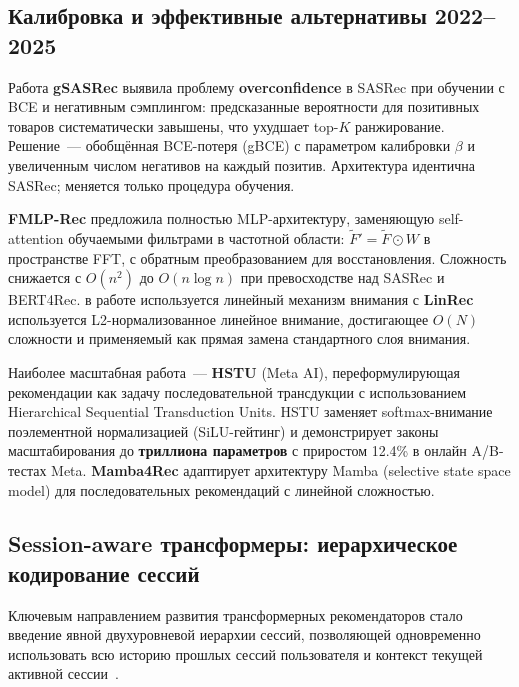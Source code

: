 \subsection{Калибровка и эффективные альтернативы 2022–2025}
\label{subsec:ch1:efficient}

Работа \textbf{gSASRec} \cite{petrov2023gsasrec} выявила проблему \textbf{overconfidence} в SASRec при обучении с BCE и негативным сэмплингом: предсказанные вероятности для позитивных товаров систематически завышены, что ухудшает top-$K$ ранжирование. 
Решение~--- обобщённая BCE-потеря (gBCE) с параметром калибровки $\beta$ и увеличенным числом негативов на каждый позитив. 
Архитектура идентична SASRec; меняется только процедура обучения.

\textbf{FMLP-Rec} \cite{zhou2022fmlprec} предложила полностью MLP-архитектуру, заменяющую self-attention обучаемыми фильтрами в частотной области: $\tilde{F}' = \tilde{F} \odot W$ в пространстве FFT, с обратным преобразованием для восстановления. 
Сложность снижается с $O(n^2)$ до $O(n \log n)$ при превосходстве над SASRec и BERT4Rec. 
в работе используется линейный механизм внимания с \textbf{LinRec} \cite{liu2023linrec} используется L2-нормализованное линейное внимание, достигающее $O(N)$ сложности и применяемый как прямая замена стандартного слоя внимания.

Наиболее масштабная работа~--- \textbf{HSTU} \cite{zhai2024hstu} (Meta AI), переформулирующая рекомендации как задачу последовательной трансдукции с использованием Hierarchical Sequential Transduction Units. HSTU заменяет softmax-внимание поэлементной нормализацией (SiLU-гейтинг) и демонстрирует законы масштабирования до \textbf{триллиона параметров} с приростом 12.4\% в онлайн A/B-тестах Meta. 
\textbf{Mamba4Rec} \cite{liu2024mamba4rec} адаптирует архитектуру Mamba (selective state space model) для последовательных рекомендаций с линейной сложностью.

\subsection{Session-aware трансформеры: иерархическое кодирование сессий}
\label{subsec:ch1:session_aware_transformers}

Ключевым направлением развития трансформерных рекомендаторов стало введение явной двухуровневой иерархии сессий, позволяющей одновременно использовать всю историю прошлых сессий пользователя и контекст текущей активной сессии~\cite{quadrana2017hrnn}.

